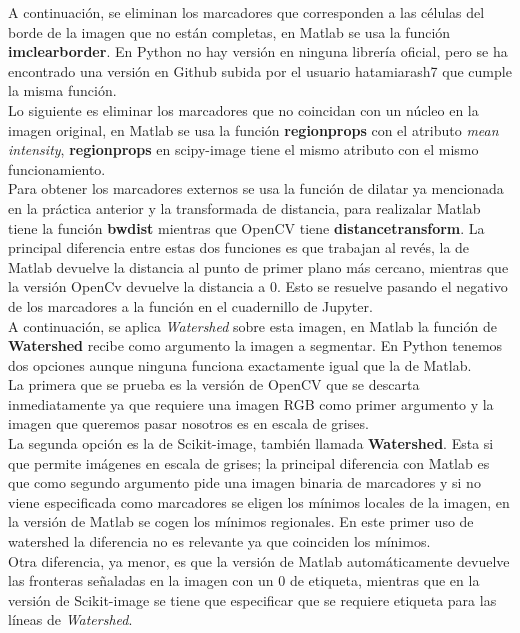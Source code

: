 \documentclass[a4paper,12pt]{report}
\begin{document}
A continuación, se eliminan los marcadores que corresponden a las células del borde de la imagen que no están completas, en Matlab se usa la función \textbf{imclearborder}. En Python no hay versión en ninguna librería oficial, pero se ha encontrado una versión en Github subida por el usuario hatamiarash7 que cumple la misma función.\\

Lo siguiente es eliminar los marcadores que no coincidan con un núcleo en la imagen original, en Matlab se usa la función\textbf{ regionprops} con el atributo \emph{mean intensity}, \textbf{regionprops} en scipy-image tiene el mismo atributo con el mismo funcionamiento.\\

Para obtener los marcadores externos se usa la función de dilatar ya mencionada en la práctica anterior y la transformada de distancia, para realizalar Matlab tiene la función \textbf{bwdist} mientras que OpenCV tiene \textbf{distancetransform}. La principal diferencia entre estas dos funciones es que trabajan al revés, la de Matlab devuelve la distancia al punto de primer plano más cercano, mientras que la versión OpenCv devuelve la distancia a 0. Esto se resuelve pasando el negativo de los marcadores a la función en el cuadernillo de Jupyter.\\

A continuación, se aplica \emph{Watershed} sobre esta imagen, en Matlab la función de \textbf{Watershed} recibe como argumento la imagen a segmentar. En Python tenemos dos opciones aunque ninguna funciona exactamente igual que la de Matlab.\\

La primera que se prueba es la versión de OpenCV que se descarta inmediatamente ya que requiere una imagen RGB como primer argumento y la imagen que queremos pasar nosotros es en escala de grises.\\

La segunda opción es la de Scikit-image, también llamada \textbf{Watershed}. Esta si que permite imágenes en escala de grises; la principal diferencia con Matlab es que como segundo argumento pide una imagen binaria de marcadores y si no viene especificada como marcadores se eligen los mínimos locales de la imagen, en la versión de Matlab se cogen los mínimos regionales. En este primer uso de watershed la diferencia no es relevante ya que coinciden los mínimos.\\

 Otra diferencia, ya menor, es que la versión de Matlab automáticamente devuelve las fronteras señaladas en la imagen con un 0 de etiqueta, mientras que en la versión de Scikit-image se tiene que especificar que se requiere etiqueta para las líneas de \emph{Watershed}.\\
\end{document}

